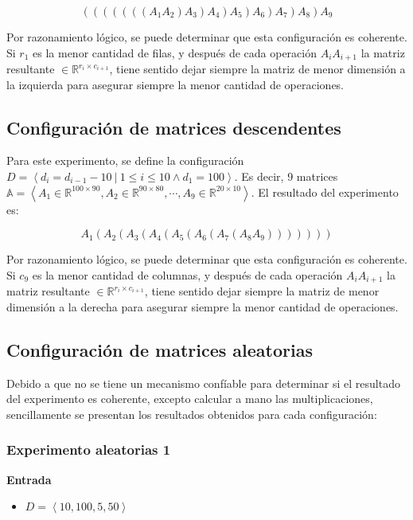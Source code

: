 \documentclass[letter]{article}
\begin{document}
\[ (((((((A_1A_2)A_3)A_4)A_5)A_6)A_7)A_8)A_9 \]

Por razonamiento lógico, se puede determinar que esta configuración es coherente. Si $r_1$ es la menor cantidad de filas, y después de cada operación $A_i A_{i+1}$ la matriz resultante $\in \mathbb{R}^{r_i \times c_{i+1}}$, tiene sentido dejar siempre la matriz de menor dimensión a la izquierda para asegurar siempre la menor cantidad de operaciones. \par

\subsection{Configuración de matrices descendentes}

Para este experimento, se define la configuración $D = \left< d_i = d_{i - 1} - 10 ~|~ 1 \leq i \leq 10 \land d_1 = 100 \right>$. Es decir, 9 matrices $\mathbb{A} = \left< A_1 \in \mathbb{R}^{100 \times 90}, A_2 \in \mathbb{R}^{90 \times 80}, \cdots, A_9 \in \mathbb{R}^{20 \times 10} \right>$. El resultado del experimento es: \par

\[ A_1(A_2(A_3(A_4(A_5(A_6(A_7(A_8A_9))))))) \]

Por razonamiento lógico, se puede determinar que esta configuración es coherente. Si $c_9$ es la menor cantidad de columnas, y después de cada operación $A_i A_{i+1}$ la matriz resultante $\in \mathbb{R}^{r_i \times c_{i+1}}$, tiene sentido dejar siempre la matriz de menor dimensión a la derecha para asegurar siempre la menor cantidad de operaciones. \par

\subsection{Configuración de matrices aleatorias}

Debido a que no se tiene un mecanismo confíable para determinar si el resultado del experimento es coherente, excepto calcular a mano las multiplicaciones, sencillamente se presentan los resultados obtenidos para cada configuración: \par

\subsubsection{Experimento aleatorias 1}

\textbf{Entrada}

\begin{itemize}
    \item $D = \left< 10,100,5,50 \right>$
\end{itemize}
\end{document}
